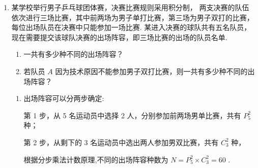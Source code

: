 \begin{enumerate}
\begin{enumerate}
\begin{enumerate}
            \item 若填入的 5 个数字中有 1 和 3，且区域 $A$ ， $B$ ， $C$ 中有奇数，试问不同的填法有多少种？
        \end{enumerate}
        \begin{jieda}
            \begin{enumerate}
                \item 首先从其它 4 个数中任选 3 个并作全排有 $P_{4}^{3} = {24}$ 种，3 个数中共有 4 个空,将 1 和 2 插入其中两个空有 $P_{4}^{2} = {12}$ 种，所以共有 ${24} \times  {12} = {288}$ 种填法.
                \item 若区域 $A,B,C$ 中无奇数，则其它三个数只能为 2、4、6 且在区域 $A,B,C$ 上，

                所以，共有 $P_{3}^{3}P_{2}^{2} = {12}$ 种，
                
                从 $2\text{ 、 }4\text{ 、 }5\text{ 、 }6$ 任选 3 个数有 ${{C}}_{4}^{3}$ 种,再把 5 个数全排有 $P_{5}^{5}$ 种,共有 ${{C}}_{4}^{3}P_{5}^{5} = {480}$ 种,
                
                综上,填入的 5 个数字中有 1 和 3 且区域 $A,B,C$ 中有奇数,共有 ${480} - {12} = {468}$ 种.
            \end{enumerate}
        \end{jieda}
        \item 某学校举行男子乒乓球团体赛，决赛比赛规则采用积分制， 两支决赛的队伍依次进行三场比赛，其中前两场为男子单打比赛，第三场为男子双打的比赛，每位出场队员在决赛中只能参加一场比赛. 某进入决赛的球队共有五名队员，现在需要提交该球队决赛的出场阵容，即三场比赛的出场的队员名单.
        \begin{enumerate}
            \item 一共有多少种不同的出场阵容？
            \item 若队员 $A$ 因为技术原因不能参加男子双打比赛，则一共有多少种不同的出场阵容？
        \end{enumerate}
        \begin{jieda}
            \begin{enumerate}
                \item 出场阵容可以分两步确定:
                
                第 1 步，从 5 名运动员中选择 2 人，分别参加前两场男单比赛，共有 $P_{5}^{2}$ 种；
                
                第 2 步，从剩下的 3 名运动员中选出两人参加男双比赛，共有 ${{C}}_{3}^{2}$ 种，
                
                根据分步乘法计数原理,不同的出场阵容种数为 $N = P_{5}^{2} \times  {{C}}_{3}^{2} = {60}$ .


\end{enumerate}
\end{jieda}
\end{enumerate}
\end{enumerate}
